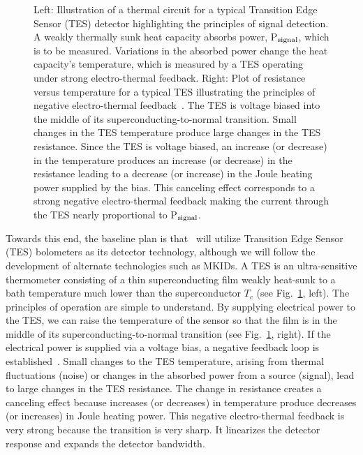 \begin{figure}[t]
\vskip 0pt
\caption{Left: Illustration of a thermal circuit for a typical
  Transition Edge Sensor (TES) detector highlighting the principles of
  signal detection. A weakly thermally sunk heat capacity absorbs
  power, P$_{\rm signal}$, which is to be measured. Variations in the
  absorbed power change the heat capacity's temperature, which is
  measured by a TES operating under strong electro-thermal
  feedback. Right: Plot of resistance versus temperature for a typical
  TES illustrating the principles of negative electro-thermal
  feedback~\cite{Irwin:1995aa}. The TES is voltage biased into the
  middle of its superconducting-to-normal transition. Small changes in
  the TES temperature produce large changes in the TES
  resistance. Since the TES is voltage biased, an increase (or
  decrease) in the temperature produces an increase (or decrease) in
  the resistance leading to a decrease (or increase) in the Joule
  heating power supplied by the bias. This canceling effect
  corresponds to a strong negative electro-thermal feedback making the
  current through the TES nearly proportional to P$_{\rm signal}$.}
\label{fig:TEScartoon}
\vskip -12pt
\end{figure}


Towards this end, the baseline plan is that \cmbexp\ will utilize Transition Edge Sensor (TES)
bolometers as its detector technology, although we will follow the development of alternate technologies such as MKIDs.  
A TES is an ultra-sensitive thermometer consisting of a thin
superconducting film weakly heat-sunk to a bath temperature much lower
than the superconductor $T_{c}$ (see Fig.~\ref{fig:TEScartoon},
left). The principles of operation are simple to understand. By
supplying electrical power to the TES, we can raise the temperature of
the sensor so that the film is in the middle of its
superconducting-to-normal transition (see Fig.~\ref{fig:TEScartoon},
right). If the electrical power is supplied via a voltage bias, a
negative feedback loop is established~\cite{Irwin:1995aa}. Small changes
to the TES temperature, arising from thermal fluctuations (noise) or
changes in the absorbed power from a source (signal), lead to large
changes in the TES resistance. The change in resistance creates a
canceling effect because increases (or decreases) in temperature
produce decreases (or increases) in Joule heating power. This negative
electro-thermal feedback is very strong because the transition is very
sharp. It linearizes the detector response and expands the detector
bandwidth.


